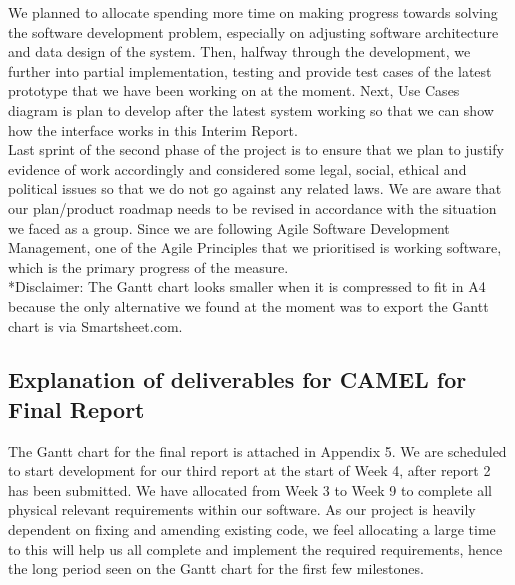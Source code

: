 	We planned to allocate spending more time on making progress towards solving the software development problem, especially on adjusting software architecture and data design of the system. Then, halfway through the development, we further into partial implementation, testing and provide test cases of the latest prototype that we have been working on at the moment. Next, Use Cases diagram is plan to develop after the latest system working so that we can show how the interface works in this Interim Report.\\
	
Last sprint of the second phase of the project is to ensure that we plan to justify evidence of work accordingly and considered some legal, social, ethical and political issues so that we do not go against any related laws. We are aware that our plan/product roadmap needs to be revised in accordance with the  situation we faced as a group.  Since we are following Agile Software Development Management, one of the Agile Principles that we prioritised is working software, which is the primary progress of the measure.\\

*Disclaimer: The Gantt chart looks smaller when it is compressed to fit in A4 because the only alternative we found at the moment was to export the Gantt chart is via Smartsheet.com.

\subsection*{Explanation of deliverables for CAMEL for Final Report}

The Gantt chart for the final report is attached in Appendix 5. We are scheduled to start development for our third report at the start of Week 4, after report 2 has been submitted. We have allocated from Week 3 to Week 9  to complete all physical relevant requirements within our software. As our project is heavily dependent on fixing and amending existing code, we feel allocating a large time to this will help us all complete and implement the required requirements, hence the long period seen on the Gantt chart for the first few milestones.\\

